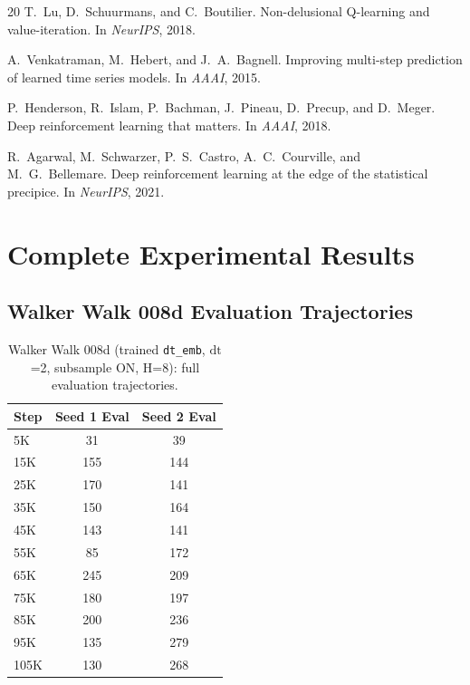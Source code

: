 \documentclass{article}
\newcommand{\dt}{\mathrm{dt}}
\begin{document}
\begin{thebibliography}{20}
T.~Lu, D.~Schuurmans, and C.~Boutilier.
\newblock Non-delusional {Q}-learning and value-iteration.
\newblock In \emph{NeurIPS}, 2018.

A.~Venkatraman, M.~Hebert, and J.~A.~Bagnell.
\newblock Improving multi-step prediction of learned time series models.
\newblock In \emph{AAAI}, 2015.

P.~Henderson, R.~Islam, P.~Bachman, J.~Pineau, D.~Precup, and D.~Meger.
\newblock Deep reinforcement learning that matters.
\newblock In \emph{AAAI}, 2018.

R.~Agarwal, M.~Schwarzer, P.~S.~Castro, A.~C.~Courville, and M.~G.~Bellemare.
\newblock Deep reinforcement learning at the edge of the statistical precipice.
\newblock In \emph{NeurIPS}, 2021.

\end{thebibliography}

\appendix
\section{Complete Experimental Results}

\subsection{Walker Walk 008d Evaluation Trajectories}

\begin{table}[h]
\centering
\caption{Walker Walk 008d (trained \texttt{dt\_emb}, $\dt$=2, subsample ON, H=8): full evaluation trajectories.}
\label{tab:appendix-008d-traj}
\begin{tabular}{lcc}
\toprule
\textbf{Step} & \textbf{Seed 1 Eval} & \textbf{Seed 2 Eval} \\
\midrule
5K & 31 & 39 \\
15K & 155 & 144 \\
25K & 170 & 141 \\
35K & 150 & 164 \\
45K & 143 & 141 \\
55K & 85 & 172 \\
65K & 245 & 209 \\
75K & 180 & 197 \\
85K & 200 & 236 \\
95K & 135 & 279 \\
105K & 130 & 268 \\
\bottomrule
\end{tabular}
\end{table}
\end{document}
